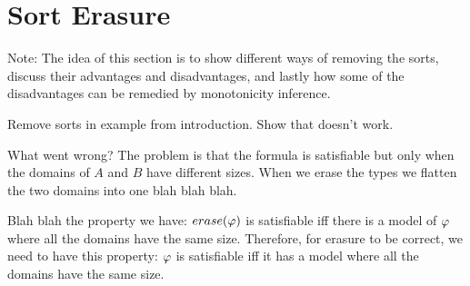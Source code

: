 
\section{Sort Erasure}

Note: The idea of this section is to show different ways of removing the
sorts, discuss their advantages and disadvantages, and lastly
how some of the disadvantages can be remedied by monotonicity inference.


Remove sorts in example from introduction. Show that doesn't work.









What went wrong? The problem is that the formula is satisfiable but only
when the domains of $A$ and $B$ have different sizes. When we erase
the types we flatten the two domains into one blah blah blah.

Blah blah the property we have: $erase(\varphi)$ is satisfiable iff there is
a model of $\varphi$ where all the domains have the same size.
Therefore, for erasure to be correct, we need to have this property:
$\varphi$ is satisfiable iff it has a model where all the domains
have the same size.


